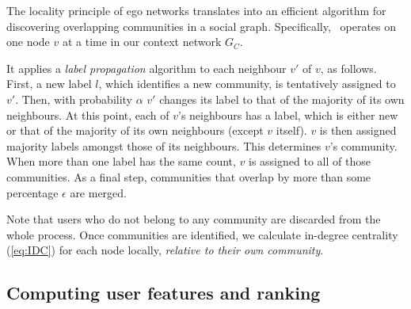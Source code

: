 The locality principle of ego networks translates into an efficient algorithm for discovering overlapping communities in a social graph. 
Specifically, \demon~operates on one node $v$ at a time in our context network $G_C$.

It applies a \textit{label propagation} algorithm to each neighbour $v'$ of $v$, as follows. First, a new label $l$, which identifies a new community, is tentatively assigned to $v'$. 
	Then, with probability $\alpha$ $v'$ changes its label to that of the majority of its own neighbours. 
	At this point, each of $v$'s neighbours has a label, which is either new or that of the majority of its own neighbours (except $v$ itself).
	$v$ is then assigned majority labels amongst those of its neighbours. 
	This determines $v$'s community. 
	When more than one label has the same count, $v$ is assigned to all of those communities.
%
As a final step, communities that overlap by more than some percentage $\epsilon $ are merged.

Note that users who do not belong to any community are discarded from the whole process. 
Once communities are identified, we calculate  in-degree centrality (\ref{eq:IDC}) for each node locally, \textit{relative to their own community}.



\subsection{Computing user features and ranking  }  \label{sec:features}

